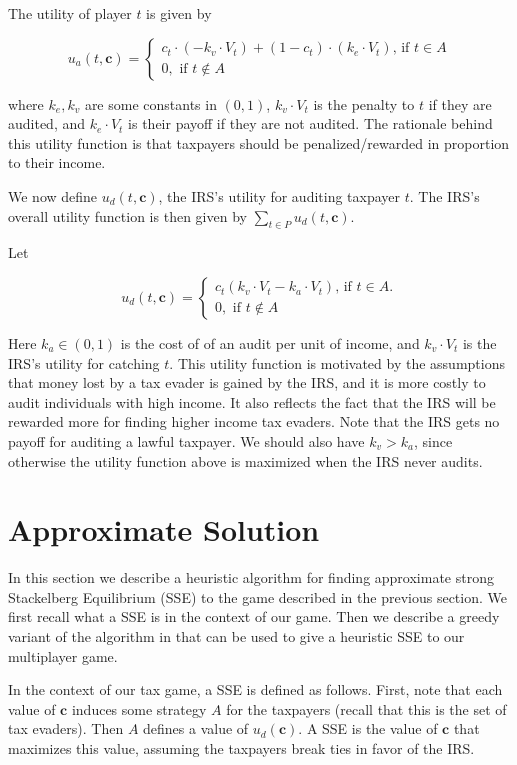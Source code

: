 \documentclass[paper=letter, fontsize=11pt]{article}
\begin{document}
The utility of player $t$ is given by

$$
u_a(t,\bm{c})=
\begin{cases}
c_t \cdot (-k_v \cdot V_t)  + (1-c_t) \cdot (k_e \cdot V_t)  \text{, if $t \in A$}\\
0, \text{ if $t \notin A$}
\end{cases}
$$

where $k_e, k_v$ are some constants in $(0,1)$, $k_v \cdot V_t$ is the
penalty to $t$ if they are audited, and $k_e \cdot V_t$ is their
payoff if they are not audited.  The rationale behind this utility
function is that taxpayers should be penalized/rewarded in proportion
to their income.

We now define $u_d(t, \bm{c})$, the IRS's utility for auditing
taxpayer $t$. The IRS's overall utility function is then given by
$\sum_{t \in P} u_d(t, \bm{c})$.

Let

$$
u_d(t,\bm{c})=
\begin{cases}
c_t(k_v \cdot V_t - k_a\cdot V_t) \text{, if $t \in A$.}\\
0, \text{ if $t \notin A$}
\end{cases}
$$

Here $k_a \in (0,1)$ is the cost of of an audit per unit of income,
and $k_v \cdot V_t$ is the IRS's utility for catching $t$. This
utility function is motivated by the assumptions that money lost by a
tax evader is gained by the IRS, and it is more costly to audit
individuals with high income. It also reflects the fact that the IRS
will be rewarded more for finding higher income tax evaders. Note that
the IRS gets no payoff for auditing a lawful taxpayer. We should also
have $k_v > k_a$, since otherwise the utility function above is
maximized when the IRS never audits.

\section*{Approximate Solution}

In this section we describe a heuristic algorithm for finding
approximate strong Stackelberg Equilibrium (SSE) to the game described
in the previous section. We first recall what a SSE is in the context
of our game. Then we describe a greedy variant of the algorithm in
\cite{conitzer2006computing} that can be used to give a heuristic SSE
to our multiplayer game.

In the context of our tax game, a SSE is defined as follows. First,
note that each value of $\bm{c}$ induces some strategy $A$ for the
taxpayers (recall that this is the set of tax evaders). Then $A$
defines a value of $u_d(\bm{c})$. A SSE is the value of $\bm{c}$ that
maximizes this value, assuming the taxpayers break ties in favor of
the IRS.
\end{document}
